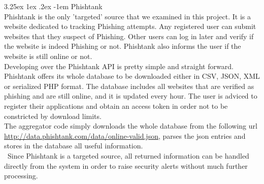 \documentclass[12pt]{article}
\makeatletter
\renewcommand\paragraph{\@startsection{paragraph}{5}{\z@}%
  {3.25ex \@plus1ex \@minus.2ex}%
  {-1em}%
  {\normalfont\normalsize\bfseries}}
\makeatother
\begin{document}
\paragraph{Phishtank}
\hfill \break\\
Phishtank is the only 'targeted' source that we examined in this project. It is a website dedicated to tracking Phishing attempts. Any registered user can submit websites that they suspect of Phishing. Other users can log in later and verify if the website is indeed Phishing or not. Phishtank also informs the user if the website is still online or not.
\hfill \break\\
Developing over the Phishtank API is pretty simple and straight forward. Phishtank offers its whole database to be downloaded either in CSV, JSON, XML or serialized PHP format. The database includes all websites that are verified as phishing and are still online, and it is updated every hour. The user is adviced to register their applications and obtain an access token in order not to be constricted by download limits.
\hfill \break\\
The aggregator code simply downloads the whole database from the following url \url{http://data.phishtank.com/data/online-valid.json}, parses the json entries and stores in the database all useful information. 
\hfill \break\\\
Since Phishtank is a targeted source, all returned information can be handled directly from the system in order to raise security alerts without much further processing. 
 
\end{document}
